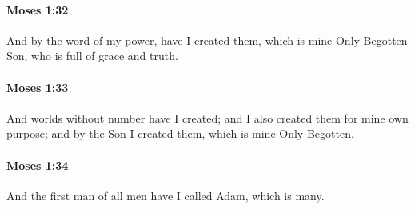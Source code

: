 		\paragraph{Moses 1:32} %
			\label{MOSES-1-32}

			And by the word of my power, have I created them, which is mine Only Begotten Son, who is full of grace and truth.


		\paragraph{Moses 1:33} %
			\label{MOSES-1-33}

			And worlds without number have I created; and I also created them for mine own purpose; and by the Son I created them, which is mine Only Begotten.


		\paragraph{Moses 1:34} %
			\label{MOSES-1-34}

			And the first man of all men have I called Adam, which is many.


